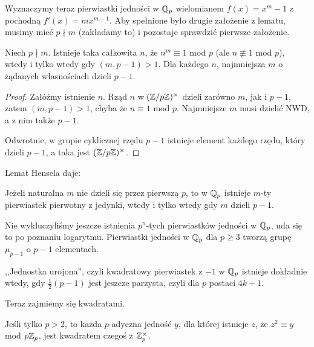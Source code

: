 \begin{historia}\end{historia} %

Wyznaczymy teraz pierwiastki jedności w $\mathbb Q_p$ wielomianem $f(x) = x^m - 1$ z pochodną $f'(x) = mx^{m-1}$.
Aby spełnione było drugie założenie z lematu, musimy mieć $p \nmid m$ (zakładamy to) i pozostaje sprawdzić pierwsze założenie.

\begin{lemat}
	Niech $p \nmid m$.
	Istnieje taka całkowita $n$, że $n^m \equiv 1$ mod $p$ (ale $n \not\equiv 1$ mod $p$), wtedy i tylko wtedy gdy $(m, p - 1) > 1$.
	Dla każdego $n$, najmniejsza $m$ o żądanych własnościach dzieli $p-1$.
\end{lemat}

\begin{proof}
	Załóżmy istnienie $n$.
	Rząd $n$ w $(\mathbb Z / p\mathbb Z)^\times$ dzieli zarówno $m$, jak i $p-1$, zatem $(m, p-1) > 1$, chyba że $n \equiv 1$ mod $p$.
	Najmniejsze $m$ musi dzielić NWD, a z nim także $p-1$.

	Odwrotnie, w grupie cyklicznej rzędu $p-1$ istnieje element każdego rzędu, który dzieli $p-1$, a taka jest $(\mathbb Z/p\mathbb Z)^\times$.
\end{proof}

Lemat Hensela daje:

\begin{fakt}
	Jeżeli naturalna $m$ nie dzieli się przez pierwszą $p$, to w $\mathbb Q_p$ istnieje $m$-ty pierwiastek pierwotny z jedynki, wtedy i tylko wtedy gdy $m$ dzieli $p-1$.
\end{fakt}

Nie wykluczyliśmy jeszcze istnienia $p^n$-tych pierwiastków jedności w $\mathbb Q_p$, uda się to po poznaniu logarytmu.
Pierwiastki jedności w $\mathbb Q_p$ dla $p \ge 3$ tworzą grupę $\mu_{p-1}$ o $p-1$ elementach.

,,Jednostka urojona'', czyli kwadratowy pierwiastek z $-1$ w $\mathbb Q_p$ istnieje dokładnie wtedy, gdy $\frac 1 2(p-1)$ jest jeszcze parzysta, czyli dla $p$ postaci $4k+1$.

Teraz zajmiemy się kwadratami.

\begin{fakt}
	Jeśli tylko $p > 2$, to każda $p$-adyczna jedność $y$, dla której istnieje $z$, że $z^2 \equiv y$ mod $p \mathbb Z_p$, jest kwadratem czegoś z $\mathbb Z_p^\times$.
\end{fakt}

